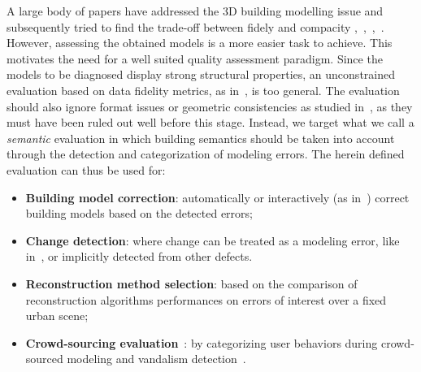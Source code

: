 \documentclass[runningheads]{llncs}
\begin{document}
A large body of papers have addressed the 3D building modelling issue and subsequently tried to find the trade-off between fidely and compacity \cite{dick2004modelling},~\cite{zebedin2008fusion},~\cite{Lafarge2010},~\cite{verdie2015lod}. However, assessing the obtained models is a more easier task to achieve. This motivates the need for a well suited quality assessment paradigm. Since the models to be diagnosed display strong structural properties, an unconstrained evaluation based on data fidelity metrics, as in~\cite{berger2013benchmark}, is too general. The evaluation should also ignore format issues or geometric consistencies as studied in~\cite{ledoux2018val3dity}, as they must have been ruled out well before this stage. Instead, we target what we call a \textit{semantic} evaluation in which building semantics should be taken into account through the detection and categorization of modeling errors. The herein defined evaluation can thus be used for:
    \begin{itemize}
        \item \textbf{Building model correction}: automatically or interactively (as in~\cite{kowdle2011active}) correct building models based on the detected errors;
        \item \textbf{Change detection}: where change can be treated as a modeling error, like in~\cite{taneja2015geometric}, or implicitly detected from other defects.
        \item \textbf{Reconstruction method selection}: based on the comparison of reconstruction algorithms performances on errors of interest over a fixed urban scene;
        \item \textbf{Crowd-sourcing evaluation}~\cite{kovashka2016crowdsourcing}: by categorizing user behaviors during crowd-sourced modeling and vandalism detection~\cite{neis2012towards}.
    \end{itemize}
\end{document}
